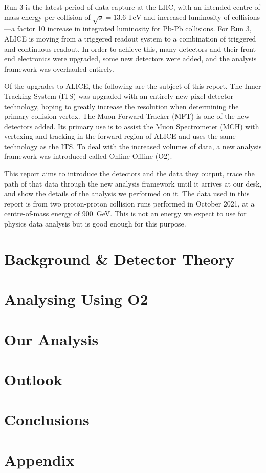 \documentclass[11pt]{article}
\numberwithin{equation}{section}
\numberwithin{figure}{section}
\numberwithin{table}{section}
\begin{document}
Run 3 is the latest period of data capture at the LHC, with an intended centre of mass energy per collision of $\sqrt{s}=\SI{13.6}{\tera\electronvolt}$ and increased luminosity of collisions---a factor 10 increase in integrated luminosity for Pb-Pb collisions. For Run 3, ALICE is moving from a triggered readout system to a combination of triggered and continuous readout. In order to achieve this, many detectors and their front-end electronics were upgraded, some new detectors were added, and the analysis framework was overhauled entirely. 

Of the upgrades to ALICE, the following are the subject of this report. The Inner Tracking System (ITS) was upgraded with an entirely new pixel detector technology, hoping to greatly increase the resolution when determining the primary collision vertex. The Muon Forward Tracker (MFT) is one of the new detectors added. Its primary use is to assist the Muon Spectrometer (MCH) with vertexing and tracking in the forward region of ALICE and uses the same technology as the ITS. To deal with the increased volumes of data, a new analysis framework was introduced called Online-Offline (O2). 

This report aims to introduce the detectors and the data they output, trace the path of that data through the new analysis framework until it arrives at our desk, and show the details of the analysis we performed on it. The data used in this report is from two proton-proton collision runs performed in October 2021, at a centre-of-mass energy of \SI{900}{\giga\electronvolt}. This is not an energy we expect to use for physics data analysis but is good enough for this purpose.

\section{Background \& Detector Theory}\label{sec:Background_Detector}


\section{Analysing Using O2}\label{sec:AnalysingWithO2}


\section{Our Analysis}\label{sec:OurAnalysis}


\section{Outlook}

\section{Conclusions}



\newpage
\printbibliography

\newpage
\section*{Appendix}
\appendix

\end{document}
